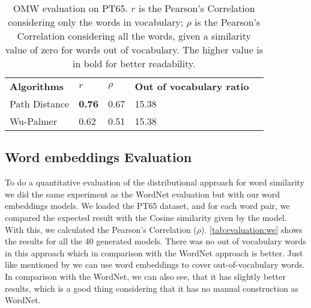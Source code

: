 \begin{table}[h]
    \caption{OMW evaluation on PT65. \textbf{$r$} is the Pearson’s Correlation considering only the words in vocabulary; \textbf{$\rho$} is the Pearson’s Correlation considering all the words, given a similarity value of zero for words out of vocabulary. The higher value is in bold for better readability.
    }
    \label{tab:worneteval}
    \centering%
    \begin{minipage}{.6\textwidth}
    \begin{tabular}{@{}lllll@{}}
    \cmidrule(r){1-5}
    \textbf{Algorithms} & \textbf{$r$} & \textbf{$\rho$}         & \textbf{Out of vocabulary ratio} \\ 
    \cmidrule(r){1-4}
    Path Distance & \textbf{0.76} & 0.67   & 15.38                   \\
    Wu-Palmer     & 0.62    & 0.51         & 15.38                   \\ \cmidrule(r){1-4}
    \end{tabular}
    \end{minipage}
\end{table}

\subsection{Word embeddings Evaluation}\label{chap:results:we}

To do a quantitative evaluation of the distributional approach for word similarity we did the same experiment as the WordNet evaluation but with our word embeddings models.
We loaded the PT65 dataset, and for each word pair, we compared the expected result with the Cosine similarity given by the model. With this, we calculated the Pearson’s Correlation ($\rho$).
\autoref{tab:evaluation:we} shows the results for all the 40 generated models. There was no out of vocabulary words in this approach which in comparison with the WordNet approach is better. Just like mentioned by  we can use word embeddings to cover out-of-vocabulary words. In comparison with the WordNet, we can also see, that it has slightly better results, which is a good thing considering that it has no manual construction as WordNet.


